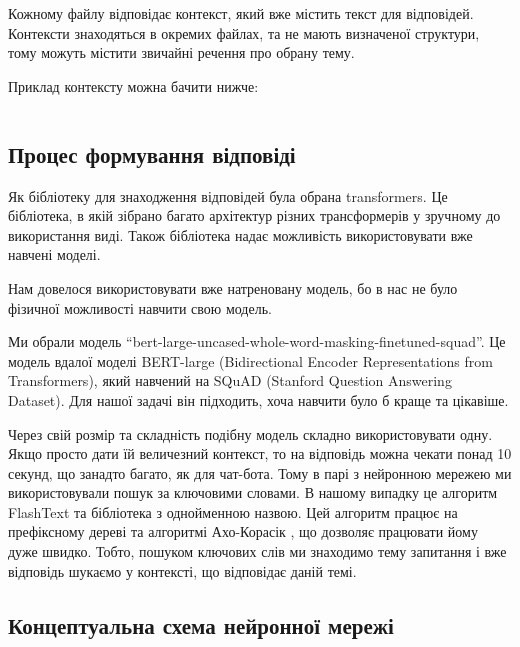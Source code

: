 \documentclass[a4paper,14pt]{extreport}
\begin{document}
    Кожному файлу відповідає контекст, який вже містить текст для відповідей. Контексти знаходяться в окремих файлах, та не мають визначеної структури, тому можуть містити звичайні речення про обрану тему.

    Приклад контексту можна бачити нижче:

    \inputminted[breaklines,linenos=true]{text}{./ai.txt}

    \subsection{Процес формування відповіді}
    Як бібліотеку для знаходження відповідей була обрана transformers. Це бібліотека, в якій зібрано багато архітектур різних трансформерів у зручному до використання виді. Також бібліотека надає можливість використовувати вже навчені моделі.
    
    Нам довелося використовувати вже натреновану модель, бо в нас не було фізичної можливості навчити свою модель.

    Ми обрали модель ``bert-large-uncased-whole-word-masking-finetuned-squad''. Це модель вдалої моделі BERT-large (Bidirectional Encoder Representations from Transformers), який навчений на SQuAD (Stanford Question Answering Dataset). Для нашої задачі він підходить, хоча навчити було б краще та цікавіше.

    Через свій розмір та складність подібну модель складно використовувати одну. Якщо просто дати їй величезний контекст, то на відповідь можна чекати понад 10 секунд, що занадто багато, як для чат-бота. Тому в парі з нейронною мережею ми використовували пошук за ключовими словами. В нашому випадку це алгоритм FlashText \cite{flashtext:arxiv} та бібліотека \cite{flashtext:repo} з однойменною назвою. Цей алгоритм працює на префіксному дереві та алгоритмі Ахо-Корасік \cite{ahocorasik:wiki}, що дозволяє працювати йому дуже швидко. Тобто, пошуком ключових слів ми знаходимо тему запитання і вже відповідь шукаємо у контексті, що відповідає даній темі.

    \subsection{Концептуальна схема нейронної мережі}
\end{document}
